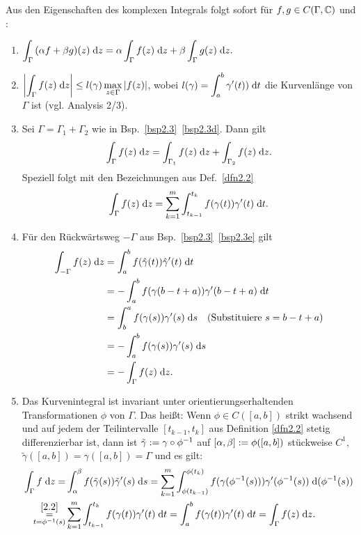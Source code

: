 \documentclass[a4paper,twoside,DIV15,BCOR12mm]{scrbook}
\begin{document}
\begin{bem}\label{bem2.5}
Aus den Eigenschaften des komplexen Integrals folgt sofort für $f,g\in C(\Gamma,\mathbb{C})$ und \kmplx{\alpha,\beta}:
\begin{enumerate}
\item $\displaystyle \int_{\Gamma}^{}{(\alpha f + \beta g)(z)}\;\mathrm{d} z = \alpha \int_{\Gamma}^{}{f(z)}\;\mathrm{d} z + \beta \int_{\Gamma}^{}{g(z)}\;\mathrm{d} z.$
\item $\displaystyle \left\lvert\int_{\Gamma}^{}{f(z)}\;\mathrm{d} z\right\lvert \le l(\gamma) \max_{z\in\Gamma}{\left\lvert f(z)\right\lvert}$, wobei $\displaystyle l(\gamma) = \int_{a}^{b}{\gamma^\prime(t))}\;\mathrm{d} t$ die Kurvenlänge von $\Gamma$ ist (vgl. Analysis 2/3).
\item Sei $\Gamma=\Gamma_1+\Gamma_2$ wie in Bsp.~\ref{bsp2.3}~\ref{bsp2.3d}. Dann gilt \[\int_{\Gamma}^{}{f(z)}\;\mathrm{d} z = \int_{\Gamma_1}^{}{f(z)}\;\mathrm{d} z + \int_{\Gamma_2}^{}{f(z)}\;\mathrm{d} z.\] Speziell folgt mit den Bezeichnungen aus Def.~\ref{dfn2.2} \[\int_{\Gamma}^{}{f(z)}\;\mathrm{d} z = \sum_{k=1}^m{\int_{t_{k-1}}^{t_k}{f(\gamma(t))\gamma^\prime(t)}\;\mathrm{d} t}.\]
\item Für den Rückwärtsweg $-\Gamma$ aus Bsp.~\ref{bsp2.3}~\ref{bsp2.3e} gilt
\begin{align*}
\int_{-\Gamma}^{}{f(z)}\;\mathrm{d} z &= \int_{a}^{b}{f(\hat{\gamma}(t))\hat{\gamma}^\prime(t)}\;\mathrm{d} t \\
&= -\int_{a}^{b}{f(\gamma(b-t+a))\gamma^\prime(b-t+a)}\;\mathrm{d} t\\
&= \int_{b}^{a}{f(\gamma(s))\gamma^\prime(s)}\;\mathrm{d} s \quad (\text{Substituiere } s=b-t+a) \\
&= -\int_{a}^{b}{f(\gamma(s))\gamma^\prime(s)}\;\mathrm{d} s\\
&= - \int_{\Gamma}^{}{f(z)}\;\mathrm{d} z.
\end{align*}

\item Das Kurvenintegral ist invariant unter orientierungserhaltenden Transformationen $\phi$ von $\Gamma$. Das heißt: Wenn $\phi\in C([a,b])$ strikt wachsend und auf jedem der Teilintervalle $[t_{k-1},t_k]$ aus Definition \ref{dfn2.2} stetig differenzierbar ist, dann ist $\tilde{\gamma}:= \gamma\circ\phi^{-1}$ auf $[\alpha,\beta]:=\phi([a,b])$ stückweise $C^1$, $\tilde{\gamma}([a,b]) = \gamma([a,b]) = \Gamma$ und es gilt:
\begin{align*}
\int_{\Gamma}^{}{f}\;\mathrm{d} z=&\int_{\alpha}^{\beta}{f(\tilde{\gamma}(s))\tilde{\gamma}^\prime(s)}\;\mathrm{d} s = \sum_{k=1}^m\int_{\phi(t_{k-1})}^{\phi(t_k)}{f(\gamma(\phi^{-1}(s)))\gamma^\prime(\phi^{-1}(s))}\;\mathrm{d}(\phi^{-1}(s))\\
\underset{t=\phi^{-1}(s)}{\overset{\eqref{2.2}}{=}}& \sum^m_{k=1}\int_{t_{k-1}}^{t_k}{f(\gamma(t))\gamma^\prime(t)}\;\mathrm{d} t = \int_{a}^{b}{f(\gamma(t))\gamma^\prime(t)}\;\mathrm{d} t = \int_{\Gamma}^{}{f(z)}\;\mathrm{d} z.
\end{align*}


\end{enumerate}
\end{bem}
\end{document}
